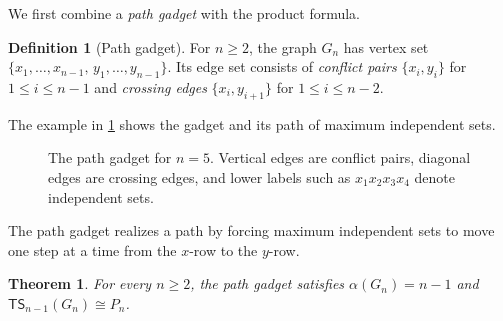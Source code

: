 \documentclass[a4paper]{article}
\theoremstyle{plain}
\newtheorem{theorem}{Theorem}[section]
\theoremstyle{definition}
\newtheorem{definition}[definition]{Definition}
\newcommand{\TSsym}{\mathsf{TS}}
\numberwithin{equation}{section}
\begin{document}
We first combine a \emph{path gadget} with the product formula.

\begin{definition}[Path gadget]
\label{def:path-gadget}
For $n\ge 2$, the graph $G_n$ has vertex set $\{x_1,\dots,x_{n-1},\,y_1,\dots,y_{n-1}\}$.
Its edge set consists of \emph{conflict pairs} $\{x_i,y_i\}$ for $1\le i\le n-1$ and \emph{crossing edges} $\{x_i,y_{i+1}\}$ for $1\le i\le n-2$.
\end{definition}

The example in \cref{fig:path-gadget} shows the gadget and its path of maximum independent sets.

\begin{figure}[ht]
\centering

\caption{The path gadget for $n=5$. Vertical edges are conflict pairs, diagonal edges are crossing edges, and lower labels such as $x_1x_2x_3x_4$ denote independent sets.}
\label{fig:path-gadget}
\end{figure}

The path gadget realizes a path by forcing maximum independent sets to move one step at a time from the $x$-row to the $y$-row.

\begin{theorem}
\label{thm:path-gadget}
For every $n\ge 2$, the path gadget satisfies $\alpha(G_n)=n-1$ and $\TSsym_{n-1}(G_n)\cong P_n$.
\end{theorem}
\end{document}
